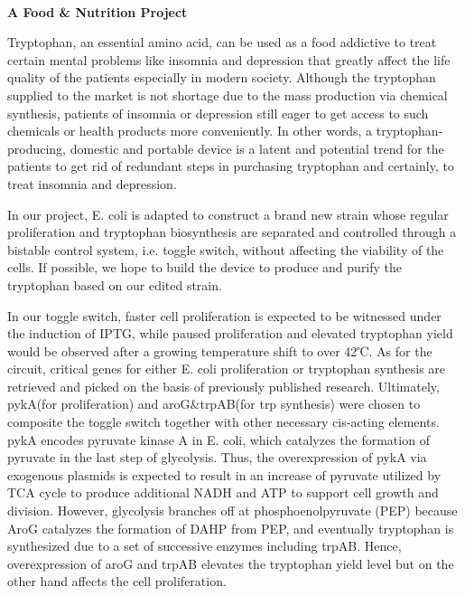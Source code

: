 \textbf{\\A Food & Nutrition Project\\}\begin{spacing}{1.5}

Tryptophan, an essential amino acid, can be used as a food addictive to treat certain mental problems like insomnia and depression that greatly affect the life quality of the patients especially in modern society. Although the tryptophan supplied to the market is not shortage due to the mass production via chemical synthesis, patients of insomnia or depression still eager to get access to such chemicals or health products more conveniently. In other words, a tryptophan-producing, domestic and portable device is a latent and potential trend for the patients to get rid of redundant steps in purchasing tryptophan and certainly, to treat insomnia and depression.

In our project, E. coli is adapted to construct a brand new strain whose regular proliferation and tryptophan biosynthesis are separated and controlled through a bistable control system, i.e. toggle switch, without affecting the viability of the cells. If possible, we hope to build the device to produce and purify the tryptophan based on our edited strain.

In our toggle switch, faster cell proliferation is expected to be witnessed under the induction of IPTG, while paused proliferation and elevated tryptophan yield would be observed after a growing temperature shift to over 42℃. As for the circuit, critical genes for either E. coli proliferation or tryptophan synthesis are retrieved and picked on the basis of previously published research. Ultimately, pykA(for proliferation) and aroG&trpAB(for trp synthesis) were chosen to composite the toggle switch together with other necessary cis-acting elements. pykA encodes pyruvate kinase A in E. coli, which catalyzes the formation of pyruvate in the last step of glycolysis. Thus, the overexpression of pykA via exogenous plasmids is expected to result in an increase of pyruvate utilized by TCA cycle to produce additional NADH and ATP to support cell growth and division. However, glycolysis branches off at phosphoenolpyruvate (PEP) because AroG catalyzes the formation of DAHP from PEP, and eventually tryptophan is synthesized due to a set of successive enzymes including trpAB. Hence, overexpression of aroG and trpAB elevates the tryptophan yield level but on the other hand affects the cell proliferation.\end{spacing}
\\


